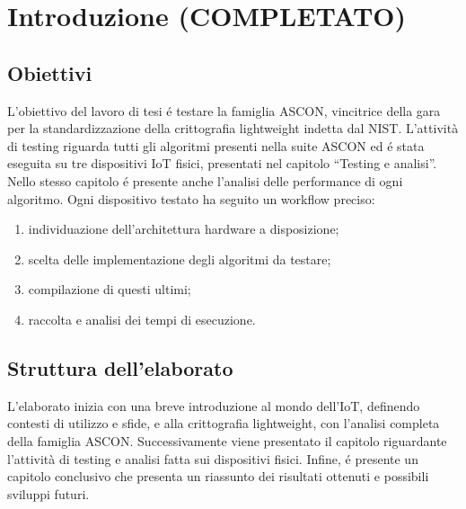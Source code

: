 \chapter{Introduzione (COMPLETATO)}

\section{Obiettivi}

L'obiettivo del lavoro di tesi é testare la famiglia ASCON, vincitrice della gara per la standardizzazione della crittografia lightweight indetta dal NIST. L'attività di testing riguarda tutti gli algoritmi presenti nella suite ASCON ed é stata eseguita su tre dispositivi IoT fisici, presentati nel capitolo ``Testing e analisi''. Nello stesso capitolo é presente anche l'analisi delle performance di ogni algoritmo. Ogni dispositivo testato ha seguito un workflow preciso: \begin{enumerate}
    \item individuazione dell'architettura hardware a disposizione;
    \item scelta delle implementazione degli algoritmi da testare;
    \item compilazione di questi ultimi;
    \item raccolta e analisi dei tempi di esecuzione.
\end{enumerate}

\section{Struttura dell'elaborato}

L'elaborato inizia con una breve introduzione al mondo dell'IoT, definendo contesti di utilizzo e sfide, e alla crittografia lightweight, con l'analisi completa della famiglia ASCON. Successivamente viene presentato il capitolo riguardante l'attività di testing e analisi fatta sui dispositivi fisici. Infine, é presente un capitolo conclusivo che presenta un riassunto dei risultati ottenuti e possibili sviluppi futuri.
